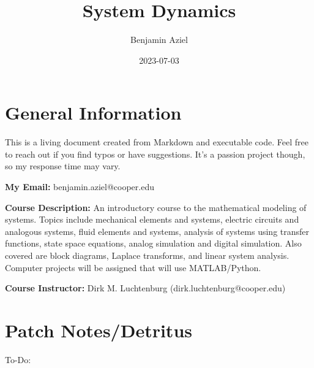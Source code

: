 \documentclass[
  letterpaper,
  DIV=11,
  numbers=noendperiod]{scrreprt}
\title{System Dynamics}
\author{Benjamin Aziel}
\date{2023-07-03}
\renewcommand*\contentsname{Table of contents}
\newcommand\contentsname{Table of contents}
\begin{document}
\maketitle
\ifdefined\Shaded\renewenvironment{Shaded}{\begin{tcolorbox}[enhanced, interior hidden, frame hidden, boxrule=0pt, borderline west={3pt}{0pt}{shadecolor}, breakable, sharp corners]}{\end{tcolorbox}}\fi

\renewcommand*\contentsname{Table of contents}
{
\hypersetup{linkcolor=}
\setcounter{tocdepth}{2}
\tableofcontents
}

\hypertarget{general-information}{%
\chapter*{General Information}\label{general-information}}


This is a living document created from Markdown and executable code.
Feel free to reach out if you find typos or have suggestions. It's a
passion project though, so my response time may vary.

\textbf{My Email:} benjamin.aziel@cooper.edu

\textbf{Course Description:} An introductory course to the mathematical
modeling of systems. Topics include mechanical elements and systems,
electric circuits and analogous systems, fluid elements and systems,
analysis of systems using transfer functions, state space equations,
analog simulation and digital simulation. Also covered are block
diagrams, Laplace transforms, and linear system analysis. Computer
projects will be assigned that will use MATLAB/Python.

\textbf{Course Instructor:} Dirk M. Luchtenburg
(dirk.luchtenburg@cooper.edu)


\hypertarget{patch-notesdetritus}{%
\chapter*{Patch Notes/Detritus}\label{patch-notesdetritus}}


To-Do:
\end{document}

